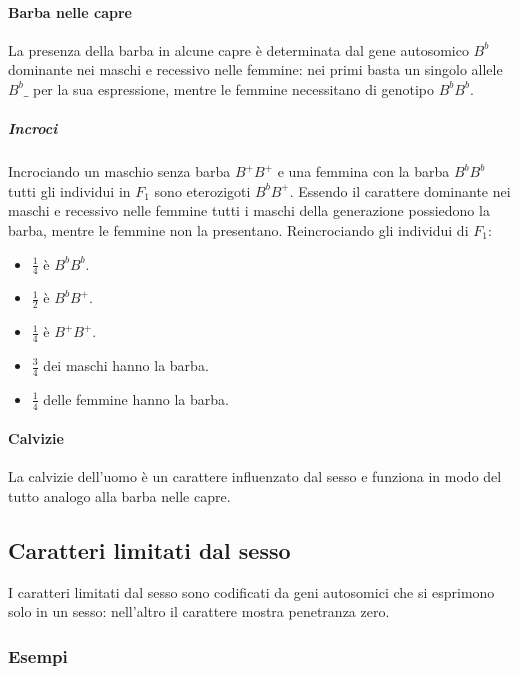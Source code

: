 \paragraph{Barba nelle capre}
La presenza della barba in alcune capre \`e determinata dal gene autosomico $B^b$ dominante nei maschi e recessivo nelle femmine: nei primi basta un singolo allele $B^b\_$ per la sua espressione, mentre
le femmine necessitano di genotipo $B^bB^b$. 
\subparagraph{Incroci}
Incrociando un maschio senza barba $B^+B^+$ e una femmina con la barba $B^bB^b$ tutti gli individui in $F_1$ sono eterozigoti $B^bB^+$. Essendo il carattere dominante nei maschi e recessivo nelle
femmine tutti i maschi della generazione possiedono la barba, mentre le femmine non la presentano. Reincrociando gli individui di $F_1$:
\begin{multicols}{2}
	\begin{itemize}
		\item $\frac{1}{4}$ \`e $B^bB^b$.
		\item $\frac{1}{2}$ \`e $B^bB^+$.
		\item $\frac{1}{4}$ \`e $B^+B^+$. 
	\end{itemize}
	\begin{itemize}
		\item $\frac{3}{4}$ dei maschi hanno la barba.
		\item $\frac{1}{4}$ delle femmine hanno la barba.
	\end{itemize}
\end{multicols}
\paragraph{Calvizie}
La calvizie dell'uomo \`e un carattere influenzato dal sesso e funziona in modo del tutto analogo alla barba nelle capre.
\subsection{Caratteri limitati dal sesso}
I caratteri limitati dal sesso sono codificati da geni autosomici che si esprimono solo in un sesso: nell'altro il carattere mostra penetranza zero.
\subsubsection{Esempi}
